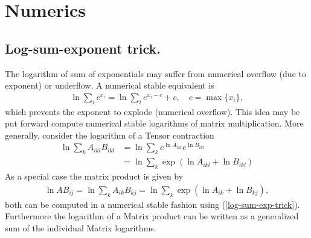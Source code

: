 \documentclass[12pt,a4paper]{article}
\begin{document}
\appendix
\section{Numerics}
\subsection{Log-sum-exponent trick. \label{log_sum_trick}} The logarithm of sum of exponentials may suffer from numerical overflow (due to exponent) or underflow. A numerical stable equivalent is
\begin{align} \label{log-sum-exp-trick}
	\ln \sum_i e^{x_i}  =  \ln \sum_i e^{x_i - c} + c, \quad c = \max\{x_i\}, 
\end{align}
which prevents the exponent to explode (numerical overflow). This idea may be put forward compute numerical stable logarithms of matrix multiplication. 
More generally, consider the logarithm of a Tensor contraction  
\begin{align}
\ln \sum_k A_{ikl} B_{ikl} &= \ln \sum_k e^{\ln A_{ikl}} e^{\ln B_{ikl}} \\
& = \ln \sum_k \exp({\ln A_{ikl} + \ln B_{ikl}}) 
\end{align}
As a special case the matrix product is given by
\begin{align}
\ln A B_{ij} = \ln \sum_k A_{ik} B_{kj} = \ln \sum_k \exp({\ln A_{ik} + \ln B_{kj}}),  
\end{align}
both can be computed in a numerical stable fashion using (\ref{log-sum-exp-trick}). Furthermore the logarithm of a Matrix product can be written as a generalized sum of the individual Matrix logarithms.




\end{document}
